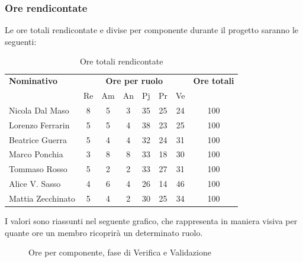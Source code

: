 \subsubsection{Ore rendicontate}
Le ore totali rendicontate e divise per componente durante il progetto saranno le seguenti:

\begin{table}[H]
	\centering
	\begin{tabular}{|l|c|c|c|c|c|c|c|}
		\hline
		\textbf{Nominativo} & 
		\multicolumn{6}{c|}{\textbf{Ore per ruolo}} & 
		\textbf{Ore totali} \\
		& Re & Am & An & Pj & Pr & Ve & \\
		\hline
		Nicola Dal Maso &8 &5 &3 &35 &25 &24 & 100 \\
		Lorenzo Ferrarin &5 &5 &4 &38 &23 &25 & 100 \\
		Beatrice Guerra &5 &4 &4 &32 &24 &31 & 100 \\
		Marco Ponchia &3 &8 &8 &33 &18 &30 & 100 \\
		Tommaso Rosso &5 &2 &2 &33 &27 &31 & 100 \\
		Alice V. Sasso &4 &6 &4 &26 &14 &46 & 100 \\
		Mattia Zecchinato &5 &4 &2 &30 &25 &34 & 100 \\
		\hline
	\end{tabular}
	\caption{Ore totali rendicontate}
\end{table}
I valori sono riassunti nel seguente grafico, che rappresenta in maniera visiva per quante ore un membro ricoprirà un determinato ruolo.
\begin{figure}[H]
	\centering
	\caption{Ore per componente, fase di Verifica e Validazione}
\end{figure}





